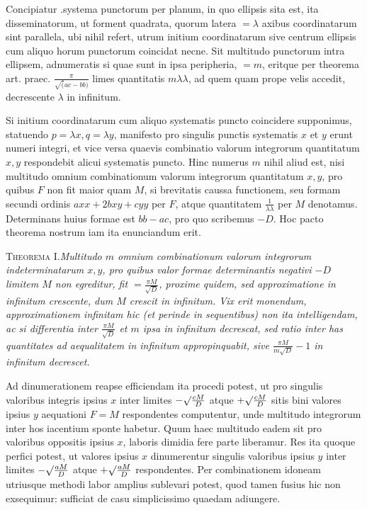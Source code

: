 Concipiatur .systema punctorum per planum, in quo ellipsis sita est, ita disseminatorum, ut forment quadrata, quorum latera $=\lambda$ axibus coordinatarum sint parallela, ubi nihil refert, utrum initium coordinatarum sive centrum ellipsis cum aliquo horum punctorum coincidat necne. Sit multitudo punctorum intra ellipsem, adnumeratis si quae sunt in ipsa peripheria, $=m$, eritque per theorema art. praec. $\frac\pi{\surd(ac-bb)}$ limes quantitatis $m\lambda\lambda$, ad quem quam prope velis accedit, decrescente $\lambda$ in infinitum.

Si initium coordinatarum cum aliquo systematis puncto coincidere supponimus, statuendo $p=\lambda x,q=\lambda y$, manifesto pro singulis punctis systematis $x$ et $y$ erunt numeri integri, et vice versa quaevis combinatio valorum integrorum
quantitatum $x,y$ respondebit alicui systematis puncto. Hinc numerus $m$ nihil aliud est, nisi multitudo omnium combinationum valorum integrorum quantitatum $x,y$, pro quibus $F$ non fit maior quam $M$, si brevitatis caussa functionem, seu formam secundi ordinis $axx+2bxy+cyy$ per $F$, atque quantitatem $\frac1{\lambda\lambda}$ per $M$ denotamus. Determinans huius formae est $bb-ac$, pro quo scribemus $-D$. Hoc pacto theorema nostrum iam ita enunciandum erit.

\textsc{Theorema I.}\quad\emph{Multitudo $m$ omnium combinationum valorum integrorum indeterminatarum $x,y$, pro quibus valor formae determinantis negativi $-D$ limitem $M$ non egreditur, fit $=\frac{\pi M}{\surd D}$, proxime quidem, sed approximatione in infinitum crescente, dum $M$ crescit in infinitum. Vix erit monendum, approximationem infinitam hic (et perinde in sequentibus) non ita intelligendam, ac si differentia inter $\frac{\pi M}{\surd D}$ et $m$ ipsa in infinitum decrescat, sed ratio inter has quantitates ad aequalitatem in infinitum appropinquabit, sive $\frac{\pi M}{m\surd D}-1$ in infinitum decrescet.}

Ad dinumerationem reapse efficiendam ita procedi potest, ut pro singulis valoribus integris ipsius $x$ inter limites $-\surd\frac{cM}D$ atque $+\surd\frac{cM}D$ sitis bini valores ipsius $y$ aequationi $F=M$ respondentes computentur, unde multitudo integrorum inter hos iacentium sponte habetur. Quum haec multitudo eadem sit pro valoribus oppositis ipsius $x$, laboris dimidia fere parte liberamur. Res ita quoque perfici potest, ut valores ipsius $x$ dinumerentur singulis valoribus ipsius $y$ inter limites $-\surd\frac{aM}D$ atque $+\surd\frac{aM}D$ respondentes. Per combinationem idoneam utriusque methodi labor amplius sublevari potest, quod tamen fusius hic non exsequimur: sufficiat de casu simplicissimo quaedam adiungere.

